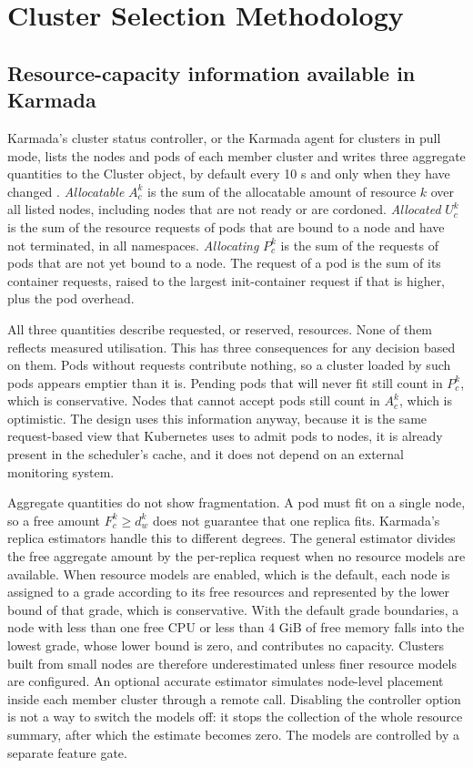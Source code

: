 \section{Cluster Selection Methodology}\label{sec:method}

\subsection{Resource-capacity information available in Karmada}\label{sec:method-capacity}

Karmada's cluster status controller, or the Karmada agent for clusters in pull mode, lists the nodes and pods of each member cluster and writes three aggregate quantities to the Cluster object, by default every 10 s and only when they have changed \cite{karmada_repo}. \emph{Allocatable} $A_c^k$ is the sum of the allocatable amount of resource $k$ over all listed nodes, including nodes that are not ready or are cordoned. \emph{Allocated} $U_c^k$ is the sum of the resource requests of pods that are bound to a node and have not terminated, in all namespaces. \emph{Allocating} $P_c^k$ is the sum of the requests of pods that are not yet bound to a node. The request of a pod is the sum of its container requests, raised to the largest init-container request if that is higher, plus the pod overhead.

All three quantities describe requested, or reserved, resources. None of them reflects measured utilisation. This has three consequences for any decision based on them. Pods without requests contribute nothing, so a cluster loaded by such pods appears emptier than it is. Pending pods that will never fit still count in $P_c^k$, which is conservative. Nodes that cannot accept pods still count in $A_c^k$, which is optimistic. The design uses this information anyway, because it is the same request-based view that Kubernetes uses to admit pods to nodes, it is already present in the scheduler's cache, and it does not depend on an external monitoring system.

Aggregate quantities do not show fragmentation. A pod must fit on a single node, so a free amount $F_c^k \geq d_w^k$ does not guarantee that one replica fits. Karmada's replica estimators handle this to different degrees. The general estimator divides the free aggregate amount by the per-replica request when no resource models are available. When resource models are enabled, which is the default, each node is assigned to a grade according to its free resources and represented by the lower bound of that grade, which is conservative. With the default grade boundaries, a node with less than one free CPU or less than 4 GiB of free memory falls into the lowest grade, whose lower bound is zero, and contributes no capacity. Clusters built from small nodes are therefore underestimated unless finer resource models are configured. An optional accurate estimator simulates node-level placement inside each member cluster through a remote call. Disabling the controller option  is not a way to switch the models off: it stops the collection of the whole resource summary, after which the estimate becomes zero. The models are controlled by a separate feature gate.

